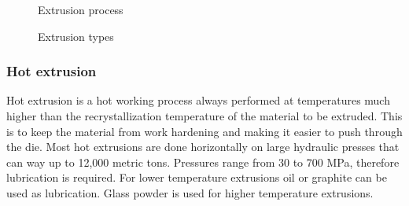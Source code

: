 \vspace{0.5cm}
\begin{figure}[htb!]
    \begin{minipage}{.50\textwidth}
    {\setlength{\fboxsep}{0pt}\setlength{\fboxrule}{0.5pt}
    }
    \centering
    \captionsetup{justification=centering}
    \caption{Extrusion process}
    \label{extrusion} 
    \end{minipage}
    \hfill
    \centering
    \begin{minipage}{.45\textwidth}
    {\setlength{\fboxsep}{0pt}\setlength{\fboxrule}{0.5pt}
    }
    \centering
    \captionsetup{justification=centering}
    \caption{Extrusion types}
    \label{extrusion_types} 
    \end{minipage}
\end{figure}

\subsubsection{Hot extrusion}
Hot extrusion is a hot working process always performed at temperatures much higher than the recrystallization temperature of the material to be extruded. This is to keep the material from work hardening and making it easier to push through the die. Most hot extrusions are done horizontally on large hydraulic presses that can way up to 12,000 metric tons. Pressures range from 30 to 700 MPa, therefore lubrication is required. For lower temperature extrusions oil or graphite can be used as lubrication. Glass powder is used for higher temperature extrusions. \cite{extrusion2}

